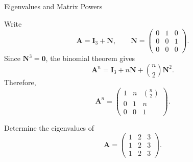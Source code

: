 \begin{expectedproblemgroup}{Eigenvalues and Matrix Powers}
        \begin{expectedsubsolution}
            Write
            \[
                \mathbf{A}=\mathbf{I}_3+\mathbf{N},
                \qquad
                \mathbf{N}
                =
                \begin{pmatrix}
                    0 & 1 & 0\\
                    0 & 0 & 1\\
                    0 & 0 & 0
                \end{pmatrix}.
            \]
            Since $\mathbf{N}^3=\mathbf{0}$, the binomial theorem gives
            \[
                \mathbf{A}^n
                =
                \mathbf{I}_3+n\mathbf{N}+\binom{n}{2}\mathbf{N}^2.
            \]
            Therefore,
            \[
                \boxed{
                    \mathbf{A}^n
                    =
                    \begin{pmatrix}
                        1 & n & \binom{n}{2}\\
                        0 & 1 & n\\
                        0 & 0 & 1
                    \end{pmatrix}
                }.
            \]
        \end{expectedsubsolution}

        \begin{expectedsubproblem}
            Determine the eigenvalues of
            \[
                \mathbf{A}
                =
                \begin{pmatrix}
                    1 & 2 & 3\\
                    1 & 2 & 3\\
                    1 & 2 & 3
                \end{pmatrix}.
            \]
        \end{expectedsubproblem}


\end{expectedproblemgroup}

